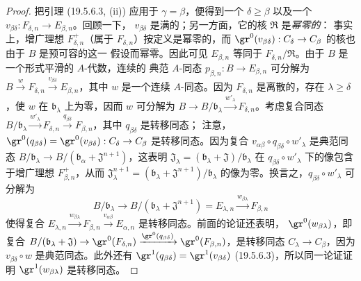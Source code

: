 \begin{proof}
把引理 (19.5.6.3, (ii)) 应用于 $\gamma=\beta$，便得到一个
$\delta\geq\beta$ 以及一个
$v_{\beta\delta}:F_{\delta,n}\to E_{\beta,n}$。回顾一下，
$v_{\beta\delta}$ 是满的；另一方面，它的核 $\mathfrak R$ 是\emph{幂零的}：
事实上，增广理想 $F_{\delta,n}^+$（属于 $F_{\delta,n}$）按定义是幂零的，而
$\gr^0(v_{\beta\delta}):C_\delta\to C_\beta$ 的核也由于 $B$ 是预可容的这一
假设而幂零。因此可见 $E_{\beta,n}$ 等同于
$F_{\delta,n}/\mathfrak R$。由于 $B$ 是一个形式平滑的 $A$-代数，连续的
典范 $A$-同态 $p_{\beta,n}:B\to E_{\beta,n}$ 可分解为
$B\xrightarrow{w}F_{\delta,n}\xrightarrow{v_{\beta\delta}}E_{\beta,n}$，其中
$w$ 是一个连续 $A$-同态。因为 $F_{\delta,n}$ 是离散的，存在
$\lambda\geq\delta$，使 $w$ 在 $\mathfrak b_\lambda$ 上为零，因而 $w$ 可分解为
$B\to B/\mathfrak b_\lambda\xrightarrow{w'_\lambda}F_{\delta,n}$。考虑复合同态
$B/\mathfrak b_\lambda\xrightarrow{w'_\lambda}F_{\delta,n}
\xrightarrow{q_{\beta\delta}}F_{\beta,n}$，其中 $q_{\beta\delta}$ 是转移同态；
注意，$\gr^0(q_{\beta\delta})=\gr^0(v_{\beta\delta}):C_\delta\to C_\beta$
是转移同态。因为复合
$v_{\alpha\beta}\circ q_{\beta\delta}\circ w'_\lambda$ 是典范同态
$B/\mathfrak b_\lambda\to
B/(\mathfrak b_\alpha+\mathfrak J^{n+1})$，这表明
$\mathfrak J_\lambda=(\mathfrak b_\lambda+\mathfrak J)/\mathfrak b_\lambda$
在 $q_{\beta\delta}\circ w'_\lambda$ 下的像包含于增广理想
$F_{\beta,n}^+$，从而
$\mathfrak J_\lambda^{n+1}=(\mathfrak b_\lambda+\mathfrak J^{n+1})/
\mathfrak b_\lambda$ 的像为零。换言之，$q_{\beta\delta}\circ w'_\lambda$
可分解为
\[
  B/\mathfrak b_\lambda\to
  B/(\mathfrak b_\lambda+\mathfrak J^{n+1})=E_{\lambda,n}
  \xrightarrow{w_{\beta\lambda}}F_{\beta,n}
\]
使得复合
$E_{\lambda,n}\xrightarrow{w_{\beta\lambda}}F_{\beta,n}
\xrightarrow{v_{\alpha\beta}}E_{\alpha,n}$ 是转移同态。前面的论证还表明，
$\gr^0(w_{\beta\lambda})$，即复合
$B/(\mathfrak b_\lambda+\mathfrak J)\to\gr^0(F_{\delta,n})
\xrightarrow{\gr^0(q_{\beta\delta})}\gr^0(F_{\beta,n})$，是转移同态
$C_\lambda\to C_\beta$，因为 $v_{\beta\delta}\circ w$ 是典范同态。此外还有
$\gr^1(q_{\beta\delta})=\gr^1(v_{\beta\delta})$ (19.5.6.3)，所以同一论证证明
$\gr^1(w_{\beta\lambda})$ 是转移同态。
\end{proof}

